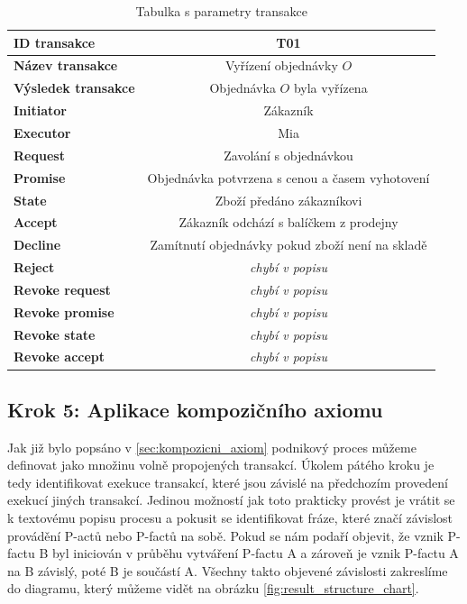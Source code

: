 \documentclass[]{article}
\begin{document}
\begin{table} [H] \centering
\begin{tabular}{|>{\bfseries} l| | c |}
\hline
  ID transakce & T01 \\
\hline
  Název transakce & Vyřízení objednávky $O$  \\
\hline
  Výsledek transakce & Objednávka $O$ byla vyřízena \\
\hline
  Initiator & Zákazník \\
\hline
  Executor & Mia \\
\hline
\hline
  Request & Zavolání s objednávkou \\
\hline
  Promise & Objednávka potvrzena s cenou a časem vyhotovení \\
\hline
  State & Zboží předáno zákazníkovi \\
\hline
  Accept & Zákazník odchází s balíčkem z prodejny \\
\hline
\hline
  Decline & Zamítnutí objednávky pokud zboží není na skladě \\
\hline
  Reject & \textit{chybí v popisu} \\
\hline
\hline
  Revoke request & \textit{chybí v popisu} \\
\hline
  Revoke promise & \textit{chybí v popisu} \\
\hline
  Revoke state & \textit{chybí v popisu} \\
\hline
  Revoke accept & \textit{chybí v popisu} \\
\hline
\end{tabular}
\caption{Tabulka s parametry transakce}
\label{tab:trans_param}
\end{table}

\subsection{Krok 5: Aplikace kompozičního axiomu}
Jak již bylo popsáno v \ref{sec:kompozicni_axiom} podnikový proces můžeme definovat jako množinu volně propojených transakcí. Úkolem pátého kroku je tedy identifikovat exekuce transakcí, které jsou závislé na předchozím provedení exekucí jiných transakcí. Jedinou možností jak toto prakticky provést je vrátit se k textovému popisu procesu a pokusit se identifikovat fráze, které značí závislost provádění P-actů nebo P-factů na sobě. Pokud se nám podaří objevit, že vznik P-factu B byl iniciován v průběhu vytváření P-factu A a zároveň je vznik P-factu A na B závislý, poté B je součástí A.  Všechny takto objevené závislosti zakreslíme do diagramu, který můžeme vidět na obrázku \ref{fig:result_structure_chart}.
\end{document}
